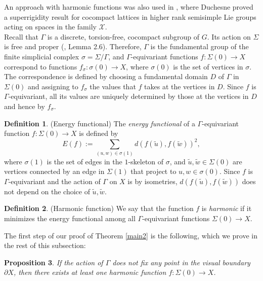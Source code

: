 \documentclass{article}
\theoremstyle{definition}
\newtheorem{dfn}{Definition}[section]
\theoremstyle{remark}
\theoremstyle{plain}
\newtheorem{prp}[dfn]{Proposition}
\begin{document}
An approach with harmonic functions was also used in \cite{duc2015sup}, where Duchesne proved a superrigidity result for cocompact lattices in higher rank semisimple Lie groups acting on spaces in the family $\mathcal{X}$. \\

Recall that $\Gamma$ is a discrete, torsion-free, cocompact subgroup of $G$. Its action on $\Sigma$ is free and proper (\cite{garland}, Lemma 2.6). Therefore, $\Gamma$ is the fundamental group of the finite simplicial complex $\sigma=\Sigma/\Gamma$, and $\Gamma$-equivariant functions $f: \Sigma(0)\rightarrow X$ correspond to functions $f_\sigma: \sigma(0)\rightarrow X$, where $\sigma(0)$ is the set of vertices in $\sigma$. The correspondence is defined by choosing a fundamental domain $D$ of $\Gamma$ in $\Sigma(0)$ and assigning to $f_\sigma$ the values that $f$ takes at the vertices in $D$. Since $f$ is $\Gamma$-equivariant, all its values are uniquely determined by those at the vertices in $D$ and hence by $f_\sigma$. \\

\begin{dfn}{(Energy functional)} \label{energy}
    The \textit{energy functional} of a $\Gamma$-equivariant function $f: \Sigma(0)\rightarrow X$ is defined by $$E(f):=\sum_{(u,w)\in\sigma(1)}{d(f(\widetilde{u}),f(\widetilde{w}))^2},$$ where $\sigma(1)$ is the set of edges in the $1$-skeleton of $\sigma$, and $\widetilde{u},\widetilde{w}\in\Sigma(0)$ are vertices connected by an edge in $\Sigma(1)$ that project to $u,w\in\sigma(0)$. Since $f$ is $\Gamma$-equivariant and the action of $\Gamma$ on $X$ is by isometries, $d(f(\widetilde{u}),f(\widetilde{w}))$ does not depend on the choice of $\widetilde{u},\widetilde{w}$. \\
\end{dfn}

\begin{dfn}{(Harmonic function)}
    We say that the function $f$ is \textit{harmonic} if it minimizes the energy functional among all $\Gamma$-equivariant functions $\Sigma(0)\rightarrow X$. \\
\end{dfn}

The first step of our proof of Theorem \ref{main2} is the following, which we prove in the rest of this subsection:

\begin{prp} \label{existence}
    If the action of $\Gamma$ does not fix any point in the visual boundary $\partial X$, then there exists at least one harmonic function $f: \Sigma(0)\rightarrow X$. \\
\end{prp}
\end{document}
